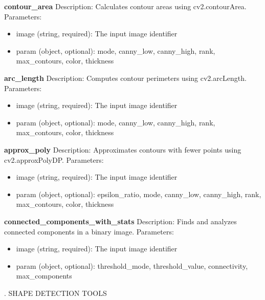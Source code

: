 \documentclass[runningheads]{llncs}
\begin{document}
\begin{tcolorbox}
\noindent \textbf{contour\_area}
\newline Description: Calculates contour areas using cv2.contourArea.
\newline Parameters:
\begin{itemize}
    \item image (string, required): The input image identifier
    \item param (object, optional): mode, canny\_low, canny\_high, rank, max\_contours, color, thickness
\end{itemize}

\noindent \textbf{arc\_length}
\newline Description: Computes contour perimeters using cv2.arcLength.
\newline Parameters:
\begin{itemize}
    \item image (string, required): The input image identifier
    \item param (object, optional): mode, canny\_low, canny\_high, rank, max\_contours, color, thickness
\end{itemize}

\noindent \textbf{approx\_poly}
\newline Description: Approximates contours with fewer points using cv2.approxPolyDP.
\newline Parameters:
\begin{itemize}
    \item image (string, required): The input image identifier
    \item param (object, optional): epsilon\_ratio, mode, canny\_low, canny\_high, rank, max\_contours, color, thickness
\end{itemize}

\noindent \textbf{connected\_components\_with\_stats}
\newline Description: Finds and analyzes connected components in a binary image.
\newline Parameters:
\begin{itemize}
    \item image (string, required): The input image identifier
    \item param (object, optional): threshold\_mode, threshold\_value, connectivity, max\_components
\end{itemize}

\vspace{4mm}
. SHAPE DETECTION TOOLS
\vspace{2mm}


\end{tcolorbox}
\end{document}
